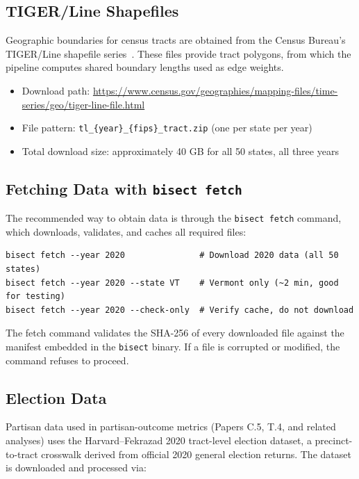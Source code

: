 \subsection*{TIGER/Line Shapefiles}

Geographic boundaries for census tracts are obtained from the
Census Bureau's TIGER/Line shapefile series~\cite{tiger2020}.
These files provide tract polygons, from which the pipeline computes
shared boundary lengths used as edge weights.

\begin{itemize}[itemsep=2pt]
  \item Download path: \url{https://www.census.gov/geographies/mapping-files/time-series/geo/tiger-line-file.html}
  \item File pattern: \texttt{tl\_\{year\}\_\{fips\}\_tract.zip} (one per state per year)
  \item Total download size: approximately 40 GB for all 50 states, all three years
\end{itemize}

\subsection*{Fetching Data with \texttt{bisect fetch}}

The recommended way to obtain data is through the \texttt{bisect fetch} command,
which downloads, validates, and caches all required files:

\begin{verbatim}
bisect fetch --year 2020               # Download 2020 data (all 50 states)
bisect fetch --year 2020 --state VT    # Vermont only (~2 min, good for testing)
bisect fetch --year 2020 --check-only  # Verify cache, do not download
\end{verbatim}

\noindent The fetch command validates the SHA-256 of every downloaded file
against the manifest embedded in the \texttt{bisect} binary.
If a file is corrupted or modified, the command refuses to proceed.

\subsection*{Election Data}

Partisan data used in partisan-outcome metrics (Papers C.5, T.4, and related analyses)
uses the Harvard--Fekrazad 2020 tract-level election dataset, a precinct-to-tract
crosswalk derived from official 2020 general election returns.
The dataset is downloaded and processed via:

